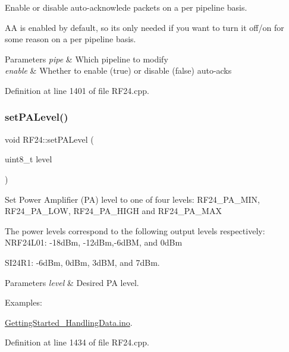 Enable or disable auto-\/acknowlede packets on a per pipeline basis.

AA is enabled by default, so it\textquotesingle{}s only needed if you want to turn it off/on for some reason on a per pipeline basis.


\begin{DoxyParams}{Parameters}
{\em pipe} & Which pipeline to modify \\
\hline
{\em enable} & Whether to enable (true) or disable (false) auto-\/acks \\
\hline
\end{DoxyParams}


Definition at line 1401 of file R\+F24.\+cpp.

\mbox{\label{classRF24_adedac579590a668ae97baccab284de8a}} 
\subsubsection{\texorpdfstring{set\+P\+A\+Level()}{setPALevel()}}
{\footnotesize\ttfamily void R\+F24\+::set\+P\+A\+Level (\begin{DoxyParamCaption}\item[{uint8\+\_\+t}]{level }\end{DoxyParamCaption})}

Set Power Amplifier (PA) level to one of four levels\+: R\+F24\+\_\+\+P\+A\+\_\+\+M\+IN, R\+F24\+\_\+\+P\+A\+\_\+\+L\+OW, R\+F24\+\_\+\+P\+A\+\_\+\+H\+I\+GH and R\+F24\+\_\+\+P\+A\+\_\+\+M\+AX

The power levels correspond to the following output levels respectively\+: N\+R\+F24\+L01\+: -\/18d\+Bm, -\/12d\+Bm,-\/6d\+BM, and 0d\+Bm

S\+I24\+R1\+: -\/6d\+Bm, 0d\+Bm, 3d\+BM, and 7d\+Bm.


\begin{DoxyParams}{Parameters}
{\em level} & Desired PA level. \\
\hline
\end{DoxyParams}
\begin{Desc}
\item[Examples\+: ]\par
\hyperlink{GettingStarted_HandlingData_8ino-example}{Getting\+Started\+\_\+\+Handling\+Data.\+ino}.\end{Desc}


Definition at line 1434 of file R\+F24.\+cpp.

